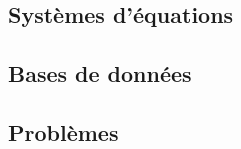 \documentclass[10pt,fleqn]{article} %
\begin{document}
\begin{multicols}{2}
\section{Systèmes d'équations}

\end{multicols}
\newpage

\begin{multicols}{2}
\section{Bases de données}

\end{multicols}
\newpage

\begin{multicols}{2}
\section{Problèmes}

\end{multicols}
\newpage
\end{document}
